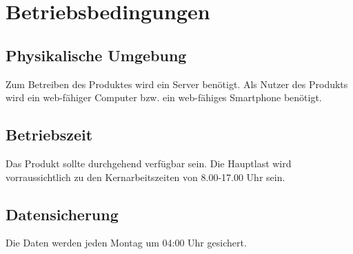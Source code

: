\section{Betriebsbedingungen}\label{Betriebsbedingungen}

\subsection{Physikalische Umgebung}
Zum Betreiben des Produktes wird ein Server benötigt.
Als Nutzer des Produkts wird ein web-fähiger Computer bzw. ein web-fähiges Smartphone benötigt.

\subsection{Betriebszeit}
Das Produkt sollte durchgehend verfügbar sein.
Die Hauptlast wird vorraussichtlich zu den Kernarbeitszeiten von 8.00-17.00 Uhr sein.

\subsection{Datensicherung}
Die Daten werden jeden Montag um 04:00 Uhr gesichert.
